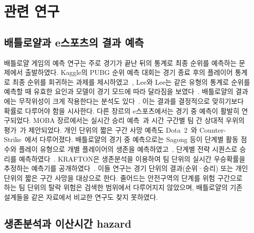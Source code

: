 \section{관련 연구}
\label{sec:related}

\subsection{배틀로얄과 e스포츠의 결과 예측}
\label{sec:related:esports}

배틀로얄 게임의 예측 연구는 주로 경기가 끝난 뒤의 통계로 최종 순위를 예측하는 문제에서 출발하였다.
Kaggle의 PUBG 순위 예측 대회는 경기 종료 후의 플레이어 통계로 최종 순위를 회귀하는 과제를 제시하였고~\cite{KagglePUBG}, Lee와 Lee는 같은 유형의 통계로 순위를 예측할 때 유효한 요인과 모델이 경기 모드에 따라 달라짐을 보였다~\cite{LeeLee25}.
배틀로얄의 결과에는 무작위성이 크게 작용한다는 분석도 있다~\cite{Galka21,Rosenbusch20}. 이는 결과를 결정적으로 맞히기보다 확률로 다루어야 함을 시사한다.
다른 장르의 e스포츠에서는 경기 중 예측이 활발히 연구되었다.
MOBA 장르에서는 실시간 승리 예측~\cite{Hodge21}과 시간 구간별 팀 간 상대적 우위의 평가~\cite{Yu19}가 제안되었다.
개인 단위의 짧은 구간 사망 예측도 Dota~2~\cite{Katona19,Ringer23}와 Counter-Strike~\cite{Marshall22}에서 다루어졌다.
배틀로얄의 경기 중 예측으로는 Sagong 등이 단계별 활동 점수와 플레이 유형으로 개별 플레이어의 생존을 예측하였고~\cite{Sagong25a}, 단계별 전략 시퀀스로 승리를 예측하였다~\cite{Sagong25b}.
KRAFTON은 생존분석을 이용하여 팀 단위의 실시간 우승확률을 추정하는 예측기를 공개하였다~\cite{KRAFTON}.
이들 연구는 경기 단위의 결과(순위·승리) 또는 개인 단위의 짧은 구간 사망을 대상으로 한다.
줄어드는 안전구역의 단계를 위험 구간으로 하는 팀 단위의 탈락 위험은 검색한 범위에서 다루어지지 않았으며, 배틀로얄의 기존 설계들을 같은 자료에서 비교한 연구도 찾지 못하였다.

\subsection{생존분석과 이산시간 hazard}
\label{sec:related:survival}

